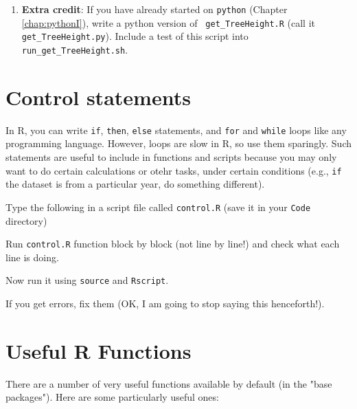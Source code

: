 \begin{enumerate}

	\item {\bf Extra credit}: If you have already started on {\tt python} 
	(Chapter \ref{chap:pythonI}), write a python version of {\tt 
	get\_TreeHeight.R} (call it {\tt get\_TreeHeight.py}). Include a test 
	of this script into {\tt run\_get\_TreeHeight.sh}.	 
\end{enumerate}

\section{Control statements}
In R, you can write {\tt if}, {\tt then}, {\tt else} statements, and 
{\tt for} and {\tt while} loops like any programming language.
However, loops are slow in R, so use them sparingly. Such statements 
are useful to include in functions and scripts because you may only 
want to do certain calculations or otehr tasks, under certain 
conditions (e.g., {\tt if} the dataset is from a particular year, do 
something different). 

\begin{compactitem}[$\quad\star$]
	\item Type the following in a script file called {\tt control.R} 
	(save it in your {\tt Code} directory) 	
	\item Run {\tt control.R} function block by block (not line by line!) 
	and check what each line is doing.
	\item Now run it using {\tt source} and {\tt Rscript}.
	\item If you get errors, fix them (OK, I am going to stop saying this 
	henceforth!).
\end{compactitem}



\section{Useful R Functions}
There are a number of very useful functions available by default (in 
the "base packages"). Here are some particularly useful ones:

